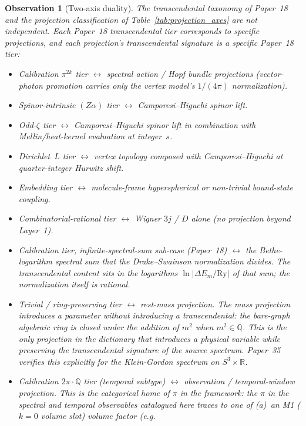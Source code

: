 \documentclass[11pt]{article}
\newtheorem{observation}{Observation}
\begin{document}
\begin{observation}[Two-axis duality]
\label{obs:duality}
The transcendental taxonomy of Paper~18 and the projection
classification of Table~\ref{tab:projection_axes} are not independent.
Each Paper~18 transcendental tier corresponds to specific projections,
and each projection's transcendental signature is a specific Paper~18
tier:
\begin{itemize}\setlength\itemsep{0pt}
\item Calibration $\pi^{2k}$ tier $\leftrightarrow$ spectral action /
Hopf bundle projections (vector-photon promotion carries only the
vertex model's $1/(4\pi)$ normalization).
\item Spinor-intrinsic $(Z\alpha)$ tier $\leftrightarrow$
Camporesi--Higuchi spinor lift.
\item Odd-$\zeta$ tier $\leftrightarrow$ Camporesi--Higuchi spinor
lift in combination with Mellin/heat-kernel evaluation at integer~$s$.
\item Dirichlet~$L$ tier $\leftrightarrow$ vertex topology composed
with Camporesi--Higuchi at quarter-integer Hurwitz shift.
\item Embedding tier $\leftrightarrow$ molecule-frame hyperspherical
or non-trivial bound-state coupling.
\item Combinatorial-rational tier $\leftrightarrow$
Wigner $3j$ / $D$ alone (no projection beyond Layer~1).
\item Calibration tier, infinite-spectral-sum sub-case (Paper~18)
$\leftrightarrow$ the Bethe-logarithm spectral sum that the
Drake--Swainson normalization divides.  The transcendental content
sits in the logarithms $\ln|\Delta E_m/\mathrm{Ry}|$ of that
sum; the normalization itself is rational.
\item \emph{Trivial / ring-preserving tier} $\leftrightarrow$
rest-mass projection.  The mass projection introduces a parameter
without introducing a transcendental: the bare-graph algebraic
ring is closed under the addition of $m^2$ when $m^2 \in \mathbb{Q}$.
This is the only projection in the dictionary that introduces a
physical variable while preserving the transcendental signature of
the source spectrum.  Paper~35 verifies this explicitly for the
Klein-Gordon spectrum on $S^3 \times \mathbb{R}$.
\item \emph{Calibration $2\pi \cdot \mathbb{Q}$ tier (temporal subtype)}
$\leftrightarrow$ observation / temporal-window projection.  This is
the categorical home of $\pi$ in the framework: the $\pi$ in the
spectral and temporal observables catalogued here traces to one of (a)~an M1 ($k = 0$ volume slot) volume factor (e.g.\

\end{itemize}
\end{observation}
\end{document}
